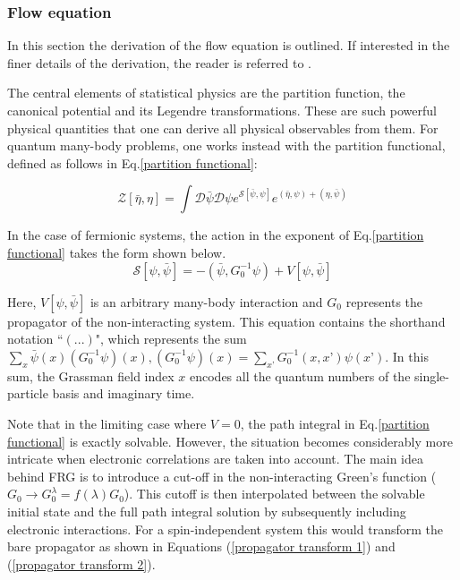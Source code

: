 \documentclass[11pt]{article}
\begin{document}
\subsubsection{Flow equation}
\label{subsubsec:Flow Equation}

In this section the derivation of the flow equation is outlined. 
If interested in the finer details of the derivation, the reader is referred to \cite{metzner2012functional}. \par
\medskip
\noindent The central elements of statistical physics are the partition function, the canonical potential and its Legendre transformations. 
These are such powerful physical quantities that one can derive all physical observables from them.
For quantum many-body problems, one works instead with the partition functional, defined as follows in Eq.\ref{partition functional}:

\begin{equation}\label{partition functional}
    \mathcal{Z}[\bar{\eta}, \eta] = \int \mathcal{D} \bar{\psi} \mathcal{D}\psi e^{\mathcal{S}[\bar{\psi}, \psi]}e^{(\bar{\eta}, \psi)+(\eta, \bar{\psi})}
\end{equation}

\noindent In the case of fermionic systems, the action in the exponent of Eq.\ref{partition functional} takes the form shown below.
\begin{equation} \label{action}
    \mathcal{S}[\psi, \bar{\psi}] = -(\bar{\psi}, G_0^{-1} \psi) + V[\psi, \bar{\psi}]
\end{equation}

\noindent Here, $V[\psi, \bar{\psi}]$ is an arbitrary many-body interaction and $G_0$ represents the propagator of the non-interacting system. 
This equation contains the shorthand notation ``$(...)$", which represents the sum $\sum_x \bar{\psi}(x)(G_0^{-1}\psi)(x), (G_0^{-1}\psi)(x) = \sum_{x’}G_0^{-1}(x,x’)\psi(x’)$. In this sum, the Grassman field index $x$ encodes all the quantum numbers of the single-particle basis and imaginary time.\par
\medskip

\noindent Note that in the limiting case where $V=0$, the path integral in Eq.\ref{partition functional} is exactly solvable. 
However, the situation becomes considerably more intricate when electronic correlations are taken into account.
The main idea behind FRG is to introduce a cut-off in the non-interacting Green's function ($G_0 \rightarrow G_0^{\lambda} = f(\lambda)G_0$). 
This cutoff is then interpolated between the solvable initial state and the full path integral solution by subsequently including electronic interactions. For a spin-independent system this would transform the 
bare propagator as shown in Equations (\ref{propagator transform 1}) and (\ref{propagator transform 2}). 
\end{document}
